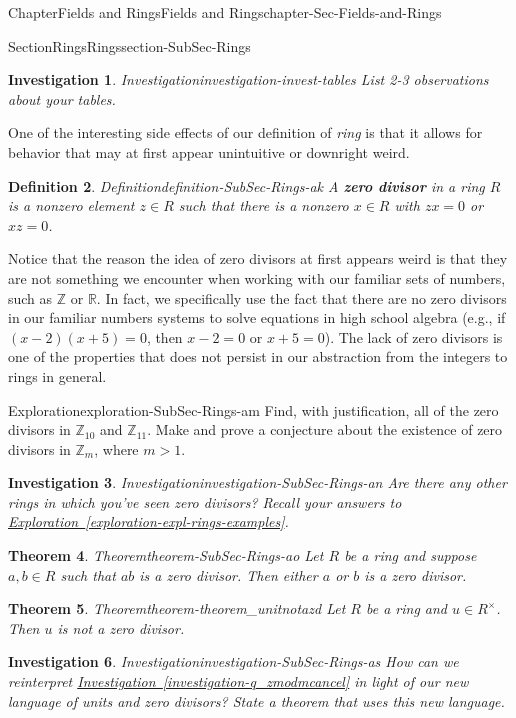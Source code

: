 \documentclass[oneside,10pt,]{book}
\newcommand{\xreffont}{\relax}
\newcommand{\terminology}[1]{\textbf{#1}}
\numberwithin{equation}{section}
\def\Z{{\mathbb Z}}
\def\R{{\mathbb R}}
\newtheorem{theorem}{Theorem}[section]
\newtheorem{definition}[theorem]{Definition}
\newtheorem{investigation}[theorem]{Investigation}
\begin{document}
\begin{chapterptx}{Chapter}{Fields and Rings}{}{Fields and Rings}{}{}{chapter-Sec-Fields-and-Rings}
\begin{sectionptx}{Section}{Rings}{}{Rings}{}{}{section-SubSec-Rings}
\begin{investigation}{Investigation}{}{investigation-invest-tables}
List 2-3 observations about your tables.%
\end{investigation}%
One of the interesting side effects of our definition of \emph{ring} is that it allows for behavior that may at first appear unintuitive or downright weird.%
\begin{definition}{Definition}{}{definition-SubSec-Rings-ak}%
%
A \terminology{zero divisor} in a ring \(R\) is a nonzero element \(z\in R\) such that there is a nonzero \(x\in R\) with \(zx = 0\) or \(xz=0\).%
\end{definition}
Notice that the reason the idea of zero divisors at first appears weird is that they are not something we encounter when working with our familiar sets of numbers, such as \(\Z\) or \(\R\). In fact, we specifically use the fact that there are no zero divisors in our familiar numbers systems to solve equations in high school algebra (e.g., if \((x-2)(x+5)=0\), then \(x-2=0\) or \(x+5=0\)). The lack of zero divisors is one of the properties that does not persist in our abstraction from the integers to rings in general.%
\begin{exploration}{Exploration}{}{exploration-SubSec-Rings-am}%
Find, with justification, all of the zero divisors in \(\Z_{10}\) and \(\Z_{11}\). Make and prove a conjecture about the existence of zero divisors in \(\Z_m\), where \(m > 1\).%
\end{exploration}%
\begin{investigation}{Investigation}{}{investigation-SubSec-Rings-an}%
Are there any other rings in which you've seen zero divisors? Recall your answers to \hyperref[exploration-expl-rings-examples]{Exploration~{\xreffont\ref{exploration-expl-rings-examples}}}.%
\end{investigation}%
\begin{theorem}{Theorem}{}{}{theorem-SubSec-Rings-ao}%
Let \(R\) be a ring and suppose \(a,b\in R\) such that \(ab\) is a zero divisor. Then either \(a\) or \(b\) is a zero divisor.%
\end{theorem}
\begin{theorem}{Theorem}{}{}{theorem-theorem_unitnotazd}%
Let \(R\) be a ring and \(u\in R^\times\). Then \(u\) is not a zero divisor.%
\end{theorem}
\begin{investigation}{Investigation}{}{investigation-SubSec-Rings-as}%
How can we reinterpret \hyperref[investigation-q_zmodmcancel]{Investigation~{\xreffont\ref{investigation-q_zmodmcancel}}} in light of our new language of units and zero divisors? State a theorem that uses this new language.%

\end{investigation}
\end{sectionptx}
\end{chapterptx}
\end{document}
